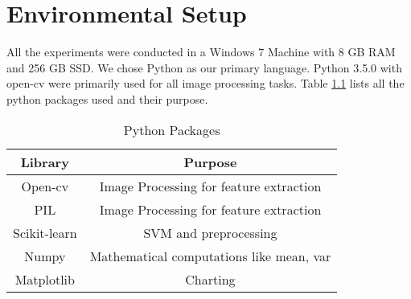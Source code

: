 \chapter{Environmental Setup}

\par All the experiments were conducted in a Windows 7 Machine with 8 GB RAM and 256 GB SSD. We chose Python as our primary language. Python 3.5.0 with open-cv were primarily used for all image processing tasks. Table \ref{table:python_packages} lists all the python packages used and their purpose.


\begin{table}[htb]
	\centering
	\caption{Python Packages}
	\begin{tabular}{ |c|c| } 
		\hline
		Library & Purpose \\
		\hline
		Open-cv & Image Processing for feature extraction  \\ 
		\hline
		PIL & Image Processing for feature extraction \\ 
		\hline
		Scikit-learn & SVM and preprocessing \\
		\hline
		Numpy & Mathematical computations like mean, var \\ 
		\hline
		Matplotlib & Charting \\
		\hline
	\end{tabular}
	\label{table:python_packages}
\end{table}







